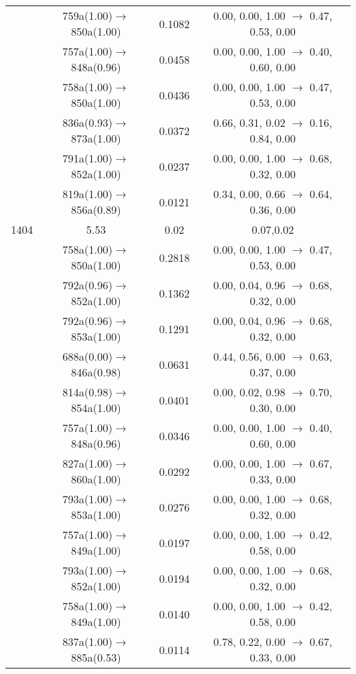 \documentclass[10pt,a4paper]{article}
\begin{document}
\begin{longtable}{c|c|c|c}
 	& 759a(1.00)$\rightarrow$850a(1.00) &	 0.1082 &	 0.00, 0.00, 1.00 $\rightarrow$ 0.47, 0.53, 0.00 \\ 
 	& 757a(1.00)$\rightarrow$848a(0.96) &	 0.0458 &	 0.00, 0.00, 1.00 $\rightarrow$ 0.40, 0.60, 0.00 \\ 
 	& 758a(1.00)$\rightarrow$850a(1.00) &	 0.0436 &	 0.00, 0.00, 1.00 $\rightarrow$ 0.47, 0.53, 0.00 \\ 
 	& 836a(0.93)$\rightarrow$873a(1.00) &	 0.0372 &	 0.66, 0.31, 0.02 $\rightarrow$ 0.16, 0.84, 0.00 \\ 
 	& 791a(1.00)$\rightarrow$852a(1.00) &	 0.0237 &	 0.00, 0.00, 1.00 $\rightarrow$ 0.68, 0.32, 0.00 \\ 
 	& 819a(1.00)$\rightarrow$856a(0.89) &	 0.0121 &	 0.34, 0.00, 0.66 $\rightarrow$ 0.64, 0.36, 0.00 \\ 
 \hline1404 &	 5.53 &	 0.02 &	 0.07,0.02 \\ 
  	& 758a(1.00)$\rightarrow$850a(1.00) &	 0.2818 &	 0.00, 0.00, 1.00 $\rightarrow$ 0.47, 0.53, 0.00 \\ 
 	& 792a(0.96)$\rightarrow$852a(1.00) &	 0.1362 &	 0.00, 0.04, 0.96 $\rightarrow$ 0.68, 0.32, 0.00 \\ 
 	& 792a(0.96)$\rightarrow$853a(1.00) &	 0.1291 &	 0.00, 0.04, 0.96 $\rightarrow$ 0.68, 0.32, 0.00 \\ 
 	& 688a(0.00)$\rightarrow$846a(0.98) &	 0.0631 &	 0.44, 0.56, 0.00 $\rightarrow$ 0.63, 0.37, 0.00 \\ 
 	& 814a(0.98)$\rightarrow$854a(1.00) &	 0.0401 &	 0.00, 0.02, 0.98 $\rightarrow$ 0.70, 0.30, 0.00 \\ 
 	& 757a(1.00)$\rightarrow$848a(0.96) &	 0.0346 &	 0.00, 0.00, 1.00 $\rightarrow$ 0.40, 0.60, 0.00 \\ 
 	& 827a(1.00)$\rightarrow$860a(1.00) &	 0.0292 &	 0.00, 0.00, 1.00 $\rightarrow$ 0.67, 0.33, 0.00 \\ 
 	& 793a(1.00)$\rightarrow$853a(1.00) &	 0.0276 &	 0.00, 0.00, 1.00 $\rightarrow$ 0.68, 0.32, 0.00 \\ 
 	& 757a(1.00)$\rightarrow$849a(1.00) &	 0.0197 &	 0.00, 0.00, 1.00 $\rightarrow$ 0.42, 0.58, 0.00 \\ 
 	& 793a(1.00)$\rightarrow$852a(1.00) &	 0.0194 &	 0.00, 0.00, 1.00 $\rightarrow$ 0.68, 0.32, 0.00 \\ 
 	& 758a(1.00)$\rightarrow$849a(1.00) &	 0.0140 &	 0.00, 0.00, 1.00 $\rightarrow$ 0.42, 0.58, 0.00 \\ 
 	& 837a(1.00)$\rightarrow$885a(0.53) &	 0.0114 &	 0.78, 0.22, 0.00 $\rightarrow$ 0.67, 0.33, 0.00 \\ 

\end{longtable}
\end{document}
